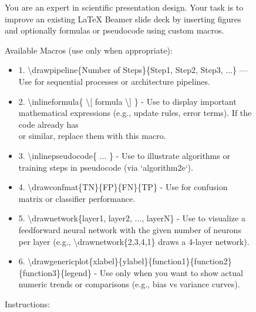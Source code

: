 \documentclass[letterpaper]{article} %
\begin{document}
\begin{figure}
\begin{tcolorbox}[colback=gray!10, colframe=black!90, title=Enhancer: Figure Prompt Template]

You are an expert in scientific presentation design. Your task is to improve an existing LaTeX Beamer slide deck by inserting figures and optionally formulas or pseudocode using custom macros.

Available Macros (use only when appropriate):

\begin{itemize}
    \item 1. \textbackslash drawpipeline\{Number of Steps\}\{Step1, Step2, Step3, ...\}  
            — Use for sequential processes or architecture pipelines.
    \item 2. \textbackslash inlineformula\{ \textbackslash [ formula \textbackslash ] \} - Use to display important mathematical expressions (e.g., update rules, error terms). If the code already has \[\] or similar, replace them with this macro.
    \item 3. \textbackslash inlinepseudocode\{ ... \} - Use to illustrate algorithms or training steps in pseudocode (via `algorithm2e`).
    \item 4. \textbackslash drawconfmat\{TN\}\{FP\}\{FN\}\{TP\} - Use for confusion matrix or classifier performance.
    \item 5. \textbackslash drawnetwork\{layer1, layer2, ..., layerN\} - Use to visualize a feedforward neural network with the given number of neurons per layer  (e.g., \textbackslash drawnetwork\{2,3,4,1\} draws a 4-layer network).
    \item 6. \textbackslash drawgenericplot\{xlabel\}\{ylabel\}\{function1\}\{function2\}\{function3\}\{legend\} - Use only when you want to show actual numeric trends or comparisons (e.g., bias vs variance curves).
\end{itemize}

Instructions:


\end{tcolorbox}
\end{figure}
\end{document}
